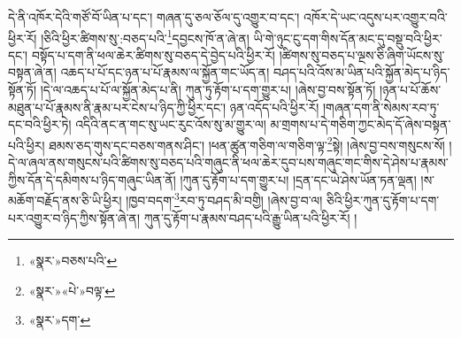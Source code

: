 དེ་ནི་འཁོར་དེའི་གཙོ་བོ་ཡིན་པ་དང་། གཞན་དུ་ཅལ་ཅོལ་དུ་འགྱུར་བ་དང་། འཁོར་དེ་ཡང་འདུས་པར་འགྱུར་བའི་ཕྱིར་རོ། །ཅིའི་ཕྱིར་ཚིགས་སུ་:བཅད་པའི་\footnote{«སྣར་»བཅས་པའི་}དབྱངས་ཁོ་ན་ཞེ་ན། ཡི་གེ་ཉུང་ངུ་དག་གིས་དོན་མང་དུ་བསྡུ་བའི་ཕྱིར་དང་། བསྟོད་པ་དག་ནི་ཕལ་ཆེར་ཚིགས་སུ་བཅད་དེ་བྱེད་པའི་ཕྱིར་རོ། །ཚིགས་སུ་བཅད་པ་ལྔས་ཅི་ཞིག་ཡོངས་སུ་བསྟན་ཞེ་ན། འཆད་པ་པོ་དང་ཉན་པ་པོ་རྣམས་ལ་སྐྱོན་གང་ཡོད་ན། བཤད་པའི་འོས་མ་ཡིན་པའི་སྐྱོན་མེད་པ་ཉིད་སྟོན་ཏོ། །དེ་ལ་འཆད་པ་པོ་ལ་སྐྱོན་མེད་པ་ནི། ཀུན་ཏུ་རྟོག་པ་དག་གྱུར་པ། །ཞེས་བྱ་བས་སྟོན་ཏོ། །ཉན་པ་པོ་ཆོས་མཐུན་པ་པོ་རྣམས་ནི་རྣམ་པར་ངེས་པ་ཉིད་ཀྱི་ཕྱིར་དང་། ཉན་འདོད་པའི་ཕྱིར་རོ། །གཞན་དག་ནི་སེམས་རབ་ཏུ་དང་བའི་ཕྱིར་ཏེ། འདིའི་ནང་ན་གང་སུ་ཡང་རུང་འོས་སུ་མ་གྱུར་ལ། མ་གྲགས་པ་དེ་གཅིག་ཀྱང་མེད་དོ་ཞེས་བསྟན་པའི་ཕྱིར། ཐམས་ཅད་གུས་དང་བཅས་གནས་ཤིང་། །ཕན་ཚུན་གཅིག་ལ་གཅིག་ལྟ་\footnote{«སྣར་»«པེ་»བལྟ་}སྟེ། །ཞེས་བྱ་བས་གསུངས་སོ། །དེ་ལ་ཞལ་ནས་གསུངས་པའི་ཚིགས་སུ་བཅད་པའི་གཞུང་ནི་ཕལ་ཆེར་དུབ་པས་གཞུང་གང་གིས་དེ་ཤེས་པ་རྣམས་ཀྱིས་དོན་དེ་དམིགས་པ་ཉིད་གཞུང་ཡིན་ནོ། །ཀུན་དུ་རྟོག་པ་དག་གྱུར་པ། །དྲན་དང་ཡེ་ཤེས་ཡོན་ཏན་ལྡན། །ས་མཆོག་བརྗོད་ནས་ཅི་ཡི་ཕྱིར། །ཁྱབ་བདག་\footnote{«སྣར་»དག་}རབ་ཏུ་བཤད་མི་བགྱི། །ཞེས་བྱ་བ་ལ། ཅིའི་ཕྱིར་ཀུན་དུ་རྟོག་པ་དག་པར་འགྱུར་བ་ཉིད་ཀྱིས་སྟོན་ཞེ་ན། ཀུན་དུ་རྟོག་པ་རྣམས་བཤད་པའི་རྒྱུ་ཡིན་པའི་ཕྱིར་རོ། །
